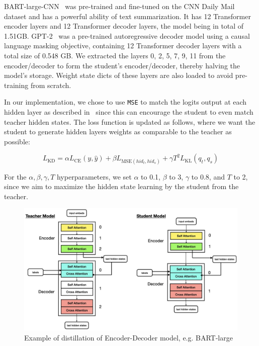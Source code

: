 BART-large-CNN~\cite{lewis2019bart} was pre-trained and fine-tuned on the CNN Daily Mail dataset and has a powerful ability of text summarization.
It has 12 Transformer encoder layers and 12 Transformer decoder layers, the model being in total of 1.51GB\@.
GPT-2~\cite{radford2019language} was a pre-trained autoregressive decoder model using a causal language masking objective,
containing 12 Transformer decoder layers with a total size of 0.548 GB. We extracted the layers 0, 2, 5, 7, 9, 11
from the encoder/decoder to form the student's encoder/decoder, thereby halving the model's storage.
Weight state dicts of these layers are also loaded to avoid pre-training from scratch.

In our implementation, we chose to use \texttt{MSE} to match the logits output at each hidden layer
as described in~\cite{shleifer2020pre} since this can encourage the student to even match teacher hidden states.
The loss function is updated as follows,
where we want the student to generate hidden layers weights as comparable to the teacher as possible:

\begin{equation}
    L_{\text{KD}} = \alpha L_{\text{CE}}(y, \hat{y}) + \beta L_{\text{MSE}(hid_t, hid_s)} + \gamma T^2 L_{\text{KL}}(q_t, q_s)
    \label{eq:kdmse-loss}
\end{equation}

For the $\alpha, \beta, \gamma, T$ hyperparameters, we set $\alpha$ to 0.1, $\beta$ to 3, $\gamma$ to 0.8,
and $T$ to 2, since we aim to maximize the hidden state learning by the student from the teacher.

\begin{figure}[hbpt]
    \centering
    \includegraphics[width=0.9\linewidth]{images/0.001}
    \caption{Example of distillation of Encoder-Decoder model, e.g. BART-large}
    \label{fig:sub1}
\end{figure}

